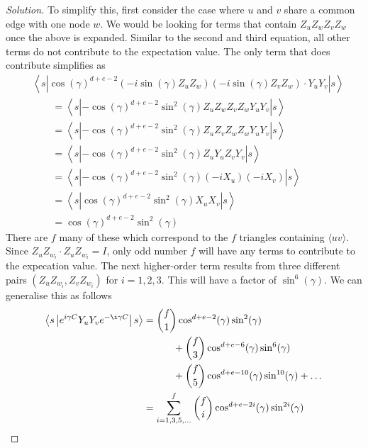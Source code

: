 \documentclass[11pt]{article}
\newenvironment{question}[2][Question]{\begin{trivlist}
\item[\hskip \labelsep {\bfseries #1}\hskip \labelsep {\bfseries #2.}]}{\end{trivlist}}
\newenvironment{solution}{\begin{proof}[Solution]}{\end{proof}}
\newcommand{\lr}[3]{\!\left#1 #3 \right#2}
\begin{document}
\begin{question}{2}
\begin{enumerate}[(a)]
\begin{solution}
                To simplify this, first consider the case where $u$ and $v$ share a common edge with one node $w$. We would be looking for terms that contain $Z_uZ_wZ_vZ_w$ once the above is expanded. Similar to the second and third equation, all other terms do not contribute to the expectation value. The only term that does contribute simplifies as 
                \begin{align*}
                    &\lr\langle\rangle {s\left|\cos(\gamma)^{d+e-2}\left(-i\sin(\gamma)Z_uZ_w\right)\left(-i\sin(\gamma)Z_vZ_w\right)\cdot Y_uY_v\right|s} \\
                    &\quad\quad= \lr\langle\rangle {s\left|-\cos(\gamma)^{d+e-2}\sin^2(\gamma)Z_uZ_wZ_vZ_wY_uY_v\right|s}  \\
                    &\quad\quad= \lr\langle\rangle {s\left|-\cos(\gamma)^{d+e-2}\sin^2(\gamma)Z_uZ_vZ_wZ_wY_uY_v\right|s} \\
                    &\quad\quad= \lr\langle\rangle {s\left|-\cos(\gamma)^{d+e-2}\sin^2(\gamma)Z_uY_uZ_vY_v\right|s} \\
                    &\quad\quad= \lr\langle\rangle {s\left|-\cos(\gamma)^{d+e-2}\sin^2(\gamma)(-iX_u)(-iX_v)\right|s} \\
                    &\quad\quad= \lr\langle\rangle {s\left|\cos(\gamma)^{d+e-2}\sin^2(\gamma)X_uX_v\right|s} \\
                    &\quad\quad= \cos(\gamma)^{d+e-2}\sin^2(\gamma)
                \end{align*}
                There are $f$ many of these which correspond to the $f$ triangles containing $\langle uv\rangle$. Since $Z_uZ_{w_i}\cdot Z_uZ_{w_i} = I$, only odd number $f$ will have any terms to contribute to the expecation value. The next higher-order term results from three different pairs $(Z_uZ_{w_i},Z_vZ_{w_i})$ for $i=1,2,3$. This will have a factor of $\sin^6(\gamma)$. We can generalise this as follows
                \begin{align*}
                    \lr\langle\rangle{s\left|e^{i\gamma C}Y_uY_ve^{-\i\gamma C}\right|s} &= \binom{f}{1}\cos^{d+e-2}(\gamma)\sin^2(\gamma) \\
                    &\quad\quad\quad + \binom{f}{3}\cos^{d+e-6}(\gamma)\sin^6(\gamma) \\
                    &\quad\quad\quad + \binom{f}{5}\cos^{d+e-10}(\gamma)\sin^{10}(\gamma) + \dots \\
                    &= \sum^f_{i=1,3,5,\dots}\binom{f}{i}\cos^{d+e-2i}(\gamma)\sin^{2i}(\gamma) \\

\end{align*}
\end{solution}
\end{enumerate}
\end{question}
\end{document}
